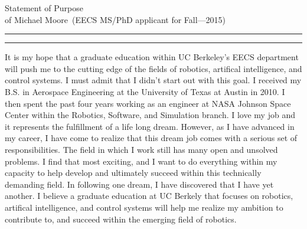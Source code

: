 \documentclass{article}
\newcommand{\soptitle}{Statement of Purpose}
\newcommand{\yourname}{Michael Moore}
\begin{document}
\begin{center}\LARGE\soptitle\\
\large of \yourname\ (EECS MS/PhD applicant for Fall---2015)
\end{center}

\hrule
\vspace{1pt}
\hrule height 1pt

\bigskip

It is my hope that a graduate education within UC Berkeley's EECS department will push me
to the cutting edge of the fields of robotics, artifical intelligence, and control
systems. I must admit that I didn't start out with this goal. I received my B.S. in Aerospace Engineering at the University of Texas at Austin in 2010. I then spent the past four years working as 
an engineer at NASA Johnson Space Center within the Robotics, Software, and Simulation branch. I love my job
and it represents the fulfillment of a life long dream. However, as I have advanced in
my career, I have come to realize that this dream job comes with a serious set of responsibilities.
The field in which I work still has many open and unsolved problems. I find that most exciting, and
I want to do everything within my capacity to help develop and ultimately succeed within this
technically demanding field. In following one dream, I have discovered that I have yet another. I believe a graduate education at UC Berkely that focuses on robotics, artifical intelligence, and control systems
will help me realize my ambition to contribute to, and succeed within the emerging field of robotics.
\end{document}
